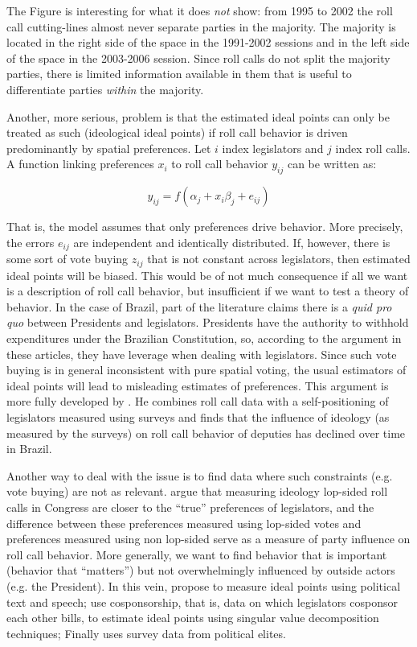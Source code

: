 The Figure is interesting for what it does \emph{not} show: from 1995 to 2002 the roll call cutting-lines almost never separate parties in the majority. The majority is located in the right side of the space in the 1991-2002 sessions and in the left side of the space in the 2003-2006 session.   Since roll calls do not split the majority parties, there is limited information available in them that is useful to differentiate parties \emph{within} the majority.

Another, more serious, problem is that the estimated ideal points can only be treated as such (ideological ideal points) if  roll call behavior is driven predominantly by spatial preferences. Let $i$ index legislators and $j$ index roll calls. A function linking preferences $x_i$ to roll call behavior $y_{ij}$ can be written as:

\begin{equation}
  \label{eq:3}
  y_{ij} = f(\alpha_j+x_i\beta_j +e_{ij})
\end{equation}

That is, the model assumes that only preferences drive behavior. More precisely, the errors $e_{ij}$ are independent and identically distributed. If, however, there is some sort of vote buying $z_{ij}$ that is not constant across legislators, then estimated ideal points will be biased. This would be of not much consequence if all we want is a description of roll call behavior, but insufficient if we want to test a theory of behavior. In the case of Brazil, part of the literature claims there is a \emph{quid pro quo} between Presidents and legislators.\citep{alston:2006,alston:2007,zucco:2007} Presidents  have the authority to withhold expenditures under the Brazilian Constitution, so, according to the argument in these articles, they have leverage when dealing with legislators.  Since such vote buying is in general inconsistent with pure spatial voting, the usual estimators of ideal points will lead to misleading estimates of preferences. This argument is more fully developed by \citet{zucco:2009}. He combines roll call data with a self-positioning of legislators measured using surveys and finds that the influence of ideology (as measured by the surveys) on roll call behavior of deputies has declined over time in Brazil. 

Another way to deal with the issue is to find data where such constraints (e.g. vote buying) are not as relevant. \citet{groseclose:2000}  argue that measuring ideology lop-sided roll calls in Congress are closer to the ``true'' preferences of legislators, and the difference between these preferences measured using lop-sided votes and preferences measured using non lop-sided serve as a measure of party influence on roll call behavior. More generally, we want to find behavior that is important  (behavior that ``matters'') but not overwhelmingly influenced by outside actors (e.g. the President).  In this vein,  \citet{monroe:2008} propose to measure ideal points using political text and speech; \citet{aleman:2009} use cosponsorship, that is, data on which legislators cosponsor each other bills, to estimate ideal points using singular value decomposition techniques; Finally \citet{saiegh:2009} uses survey data from political elites. 

